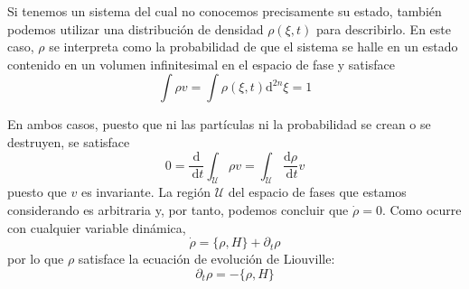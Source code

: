 Si tenemos un sistema del cual no conocemos precisamente su estado, también podemos utilizar una distribución de densidad $\rho(\xi, t)$ para describirlo. En este caso, $\rho$ se interpreta como la probabilidad de que el sistema se halle en un estado contenido en un volumen infinitesimal en el espacio de fase y satisface
$$
\int \rho v=\int \rho(\xi, t) \mathrm{d}^{2 n} \xi=1
$$

En ambos casos, puesto que ni las partículas ni la probabilidad se crean o se destruyen, se satisface
$$
0=\frac{\mathrm{d}}{\mathrm{~d} t} \int_{\mathscr{U}} \rho v=\int_{\mathscr{U}} \frac{\mathrm{d} \rho}{\mathrm{~d} t} v
$$
puesto que $v$ es invariante. La región $\mathscr{U}$ del espacio de fases que estamos considerando es arbitraria y, por tanto, podemos concluir que $\dot{\rho}=0$. Como ocurre con cualquier variable dinámica,
$$
\dot{\rho}=\{\rho, H\}+\partial_{t} \rho
$$
por lo que $\rho$ satisface la ecuación de evolución de Liouville:
$$
\partial_{t} \rho=-\{\rho, H\}
$$